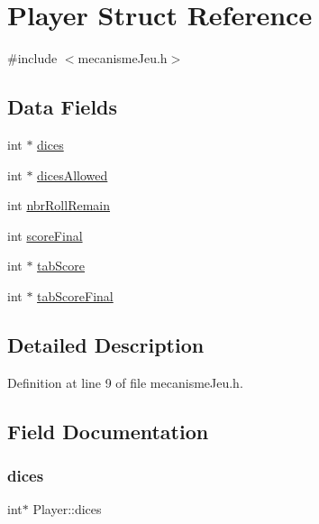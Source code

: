 \hypertarget{structPlayer}{}\section{Player Struct Reference}
\label{structPlayer}


{\ttfamily \#include $<$mecanisme\+Jeu.\+h$>$}

\subsection*{Data Fields}
\begin{DoxyCompactItemize}
\item 
int $\ast$ \hyperlink{structPlayer_a676bd9687aaa50806f419c4ae170bcb2}{dices}
\item 
int $\ast$ \hyperlink{structPlayer_adb33524b9364f3e0bcfc5bd098cdaaf0}{dices\+Allowed}
\item 
int \hyperlink{structPlayer_ae4c871b61a2af583a8b5975d736bea5d}{nbr\+Roll\+Remain}
\item 
int \hyperlink{structPlayer_a44cb6ebf8f95f9bd12f5985c9e5dfd99}{score\+Final}
\item 
int $\ast$ \hyperlink{structPlayer_a7d5c0f37c78c868e4721cc8ceece92a6}{tab\+Score}
\item 
int $\ast$ \hyperlink{structPlayer_a7c377df37ea43f041207fc4de5ac0a93}{tab\+Score\+Final}
\end{DoxyCompactItemize}


\subsection{Detailed Description}


Definition at line 9 of file mecanisme\+Jeu.\+h.



\subsection{Field Documentation}
\mbox{\label{structPlayer_a676bd9687aaa50806f419c4ae170bcb2}} 
\subsubsection{\texorpdfstring{dices}{dices}}
{\footnotesize\ttfamily int$\ast$ Player\+::dices}



